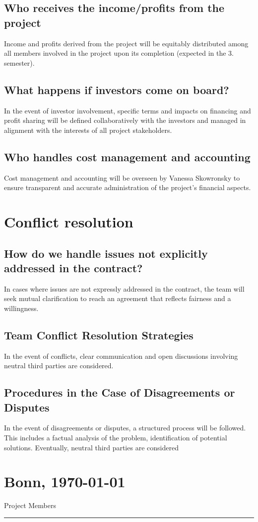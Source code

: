 \documentclass{article}
\begin{document}
\subsection{Who receives the income/profits from the project}
Income and profits derived from the project will be equitably distributed among all members involved in the project upon its completion (expected in the 3. semester).
\subsection{What happens if investors come on board?}
In the event of investor involvement, specific terms and impacts on financing and profit sharing will be defined collaboratively with the investors and managed in alignment with the interests of all project stakeholders.
\subsection{Who handles cost management and accounting}
Cost management and accounting will be overseen by Vanessa Skowronsky to ensure transparent and accurate administration of the project's financial aspects.

\section{Conflict resolution}
\subsection{How do we handle issues not explicitly addressed in the contract?}
In cases where issues are not expressly addressed in the contract, the team will seek mutual clarification to reach an agreement that reflects fairness and a willingness.

\subsection{Team Conflict Resolution Strategies}
In the event of conflicts, clear communication and open discussions involving neutral third parties are considered.
\subsection{Procedures in the Case of Disagreements or Disputes}
In the event of disagreements or disputes, a structured process will be followed. This includes a factual analysis of the problem, identification of potential solutions. Eventually, neutral third parties are considered

\vfill
\section*{Bonn, \today}

\begin{minipage}{1\textwidth}
	\centering
	Project Members
	\hrule
\end{minipage}
\end{document}
